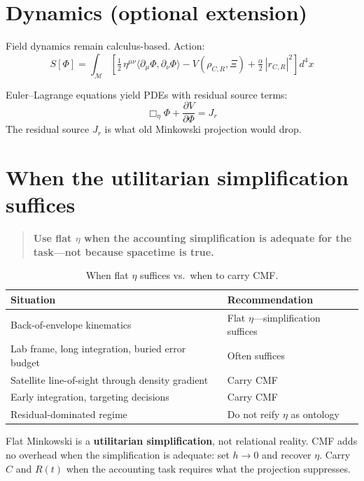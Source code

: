 \documentclass[11pt,a4paper]{article}
\newcommand{\M}{\mathcal{M}}
\newcommand{\Ph}{\Phi}
\begin{document}
\section{Dynamics (optional extension)}

Field dynamics remain calculus-based. Action:
\begin{equation}
  S[\Ph] = \int_\M \left[
    \tfrac{1}{2}\, \eta^{\mu\nu} \langle \partial_\mu \Ph, \partial_\nu \Ph \rangle
    - V(\rho_{C,R},\Xi) + \tfrac{\alpha}{2}\, |r_{C,R}|^2
  \right] d^4x
\end{equation}

Euler--Lagrange equations yield PDEs with residual source terms:
\begin{equation}
  \Box_\eta \Ph + \frac{\partial V}{\partial \Ph} = J_r
\end{equation}
The residual source $J_r$ is what old Minkowski projection would drop.

\section{When the utilitarian simplification suffices}

\begin{quote}
  \textbf{Use flat $\eta$ when the accounting simplification is adequate for the task---not because spacetime is true.}
\end{quote}

\begin{table}[h]
  \centering
  \caption{When flat $\eta$ suffices vs.\ when to carry CMF.}
  \label{tab:when}
  \begin{tabular}{@{}ll@{}}
    \toprule
    Situation & Recommendation \\
    \midrule
    Back-of-envelope kinematics & Flat $\eta$---simplification suffices \\
    Lab frame, long integration, buried error budget & Often suffices \\
    Satellite line-of-sight through density gradient & Carry CMF \\
    Early integration, targeting decisions & Carry CMF \\
    Residual-dominated regime & Do not reify $\eta$ as ontology \\
    \bottomrule
  \end{tabular}
\end{table}

Flat Minkowski is a \textbf{utilitarian simplification}, not relational reality. CMF adds no overhead when the simplification is adequate: set $h \to 0$ and recover $\eta$. Carry $C$ and $R(t)$ when the accounting task requires what the projection suppresses.
\end{document}
